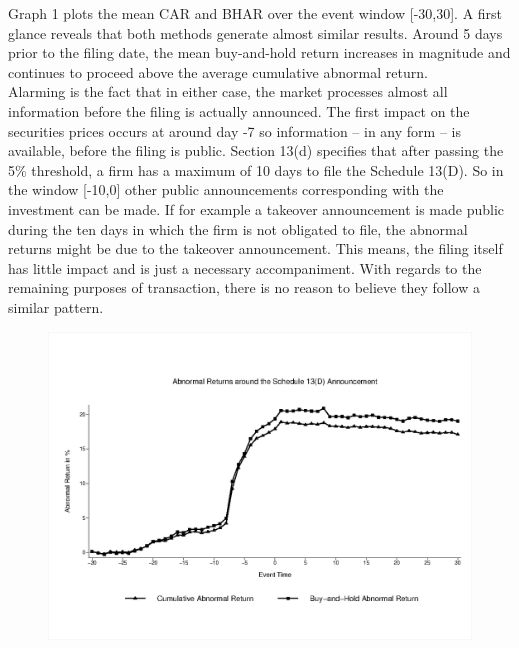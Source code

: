 \documentclass[12pt]{article}
\begin{document}
Graph 1 plots the mean CAR and BHAR over the event window [-30,30]. A first glance reveals that both methods generate almost similar results. Around 5 days prior to the filing date, the mean buy-and-hold return increases in magnitude and continues to proceed above the average cumulative abnormal return.\\
Alarming is the fact that in either case, the market processes almost all information before the filing is actually announced. The first impact on the securities prices occurs at around day -7 so information -- in any form -- is available, before the filing is public. 
Section 13(d) specifies that after passing the 5\% threshold, a firm has a maximum of 10 days to file the Schedule 13(D). So in the window [-10,0] other public announcements corresponding with the investment can be made. If for example a takeover announcement is made public during the ten days in which the firm is not obligated to file, the abnormal returns might be due to the takeover announcement. This means, the filing itself has little impact and is just a necessary accompaniment.  With regards to the remaining purposes of transaction, there is no reason to believe they follow a similar pattern. 

\begin{figure}
	\includegraphics{Abnormal_Returns.eps} \label{AR both}
\end{figure} 
\end{document}
